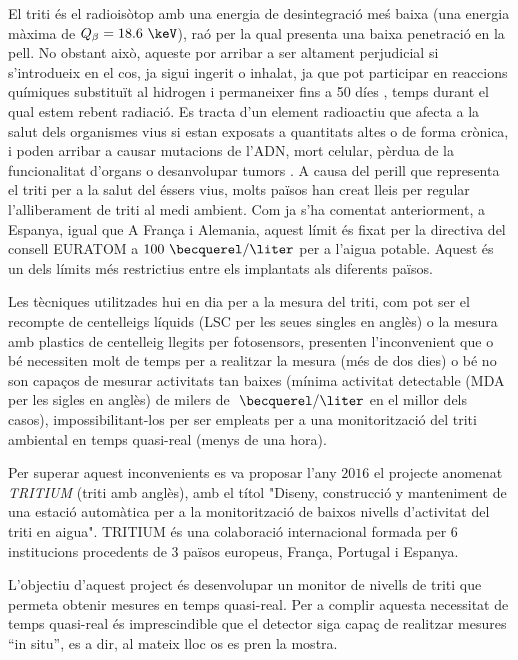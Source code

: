 El triti és el radioisòtop amb una energia de desintegració meś baixa (una energia màxima de $Q_\beta=18.6~\keV$), raó per la qual presenta una baixa penetració en la pell. No obstant això, aqueste por arribar a ser altament perjudicial si s'introdueix en el cos, ja sigui ingerit o inhalat, ja que pot participar en reaccions químiques substituït al hidrogen i permaneixer fins a 50 díes \cite{EstimationTritiumDosiKangarooRats, TissueDistribution}, temps durant el qual estem rebent radiació. Es tracta d'un element radioactiu que afecta a la salut dels organismes vius si estan exposats a quantitats altes o de forma crònica, i poden arribar a causar mutacions de l'ADN, mort celular, pèrdua de la funcionalitat d'organs o desanvolupar tumors \cite{StraumeTritiumHazard}. A causa del perill que representa el triti per a la salut del éssers vius, molts països han creat lleis per regular l'alliberament de triti al medi ambient. Com ja s'ha comentat anteriorment, a Espanya, igual que A França i Alemania, aquest límit és fixat per la directiva del consell EURATOM a $100~\becquerel/\liter$ per a l'aigua potable. Aquest és un dels límits més restrictius entre els implantats als diferents països.

Les tècniques utilitzades hui en dia per a la mesura del triti, com pot ser el recompte de centelleigs líquids (LSC per les seues singles en anglès) o la mesura amb plastics de centelleig llegits per fotosensors, presenten l'inconvenient que o bé necessiten molt de temps per a realitzar la mesura (més de dos dies) o bé no son capaços de mesurar activitats tan baixes (mínima activitat detectable (MDA per les sigles en anglès) de milers de $~\becquerel/\liter$ en el millor dels casos), impossibilitant-los per ser empleats per a una monitorització del triti ambiental en temps quasi-real (menys de una hora).

Per superar aquest inconvenients es va proposar l'any $2016$ el projecte anomenat \textit{TRITIUM} (triti amb anglès), amb el títol "Diseny, construcció y manteniment de una estació automàtica per a la monitorització de baixos nivells d'activitat del triti en aigua". TRITIUM és una colaboració internacional formada per $6$ institucions procedents de $3$ països europeus, França, Portugal i Espanya.

L'objectiu d'aquest project és desenvolupar un monitor de nivells de triti que permeta obtenir mesures en temps quasi-real. Per a complir aquesta necessitat de temps quasi-real és imprescindible que el detector siga capaç de realitzar mesures ``in situ'', es a dir, al mateix lloc os es pren la mostra.

